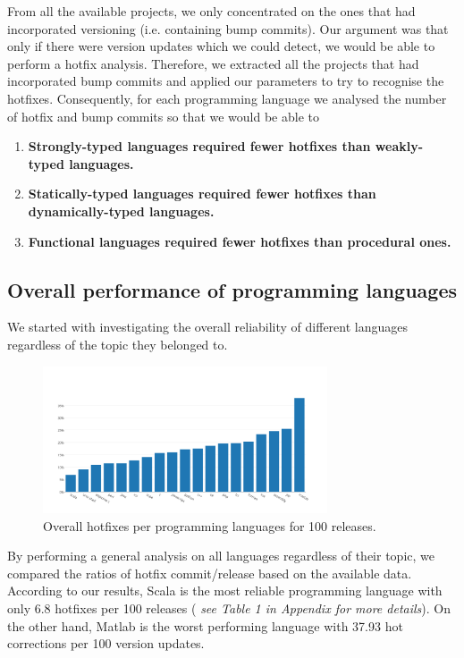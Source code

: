 From all the available projects, we only concentrated on the ones that had incorporated versioning (i.e. containing bump commits). Our argument was that only if there were version updates which we could detect, we would be able to perform a hotfix analysis. Therefore, we extracted all the projects that had incorporated bump commits and applied our parameters to try to recognise the hotfixes. Consequently, for each programming language we analysed the number of hotfix and bump commits so that we would be able to 
\begin{enumerate}
\item \textbf{Strongly-typed languages required fewer hotfixes than weakly-typed languages.}
\item \textbf{Statically-typed languages required fewer hotfixes than dynamically-typed languages.}
\item \textbf{Functional languages required fewer hotfixes than procedural ones.}
\end{enumerate}

\subsection{Overall performance of programming languages}
We started with investigating the overall reliability of different languages regardless of the topic they belonged to.\\
\begin{figure}
\centering
\includegraphics[width=0.75\textwidth]{Bar_chart}
\caption{Overall hotfixes per programming languages for 100 releases.}
\label{fig:my_label}
\end{figure}

\par
By performing a general analysis on all languages regardless of their topic, we compared the ratios of hotfix commit/release based on the available data. According to our results, Scala is the most reliable programming language with only 6.8 hotfixes per 100 releases ( \textit{see Table 1 in Appendix for more details}). On the other hand, Matlab is the worst performing language with 37.93 hot corrections per 100 version updates.\\

